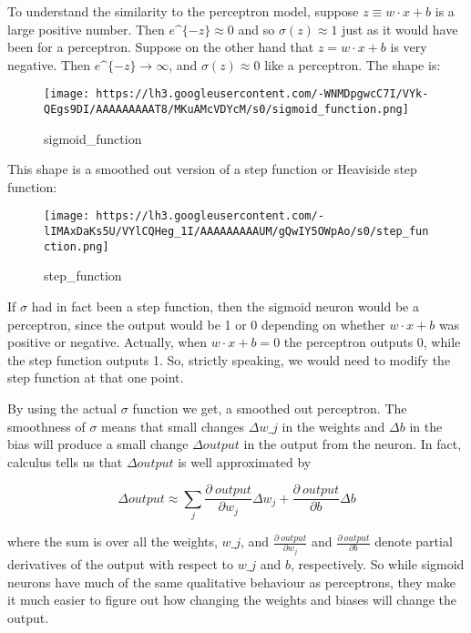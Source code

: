 \documentclass[]{article}
\begin{document}
To understand the similarity to the perceptron model, suppose $ z
\equiv w \cdot x + b $ is a large positive number. Then $ e \^{}
\{−z\} \approx 0 $ and so $ \sigma(z) \approx 1 $ just as it would
have been for a perceptron. Suppose on the other hand that $ z = w
\cdot x + b $ is very negative. Then $ e \^{} \{−z\}
\to \infty $, and $ \sigma(z) \approx 0 $ like a perceptron. The shape
is:

\begin{figure}[htbp]
\centering
\texttt{[image: https://lh3.googleusercontent.com/-WNMDpgwcC7I/VYk-QEgs9DI/AAAAAAAAAT8/MKuAMcVDYcM/s0/sigmoid\_function.png]}
\caption{sigmoid\_function}
\end{figure}

This shape is a smoothed out version of a step function or Heaviside
step function:

\begin{figure}[htbp]
\centering
\texttt{[image: https://lh3.googleusercontent.com/-lIMAxDaKs5U/VYlCQHeg\_1I/AAAAAAAAAUM/gQwIY5OWpAo/s0/step\_function.png]}
\caption{step\_function}
\end{figure}

If $ \sigma $ had in fact been a step function, then the sigmoid
neuron would be a perceptron, since the output would be 1 or 0 depending
on whether $ w \cdot x + b $ was positive or negative. Actually, when
$ w \cdot x + b = 0 $ the perceptron outputs 0, while the step
function outputs 1. So, strictly speaking, we would need to modify the
step function at that one point.

By using the actual $ \sigma $ function we get, a smoothed out
perceptron. The smoothness of $ \sigma $ means that small changes $
\Delta w\_j $ in the weights and $ \Delta b $ in the bias will
produce a small change $ \Delta output $ in the output from the
neuron. In fact, calculus tells us that $ \Delta output $ is well
approximated by

\begin{equation}
    \Delta output \approx \sum_j
    \frac {\partial \ output}{\partial w_j} \Delta w_j +
    \frac {\partial \ output}{\partial b} \Delta b
\end{equation}

where the sum is over all the weights, $ w\_j $, and $
\frac{\partial \ output}{\partial w_j} $ and $
\frac{\partial \ output}{\partial b} $ denote partial derivatives of
the output with respect to $ w\_j $ and $ b $, respectively. So
while sigmoid neurons have much of the same qualitative behaviour as
perceptrons, they make it much easier to figure out how changing the
weights and biases will change the output.
\end{document}
